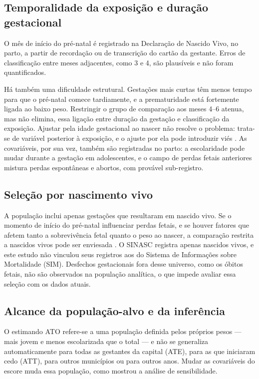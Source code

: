 \documentclass[11pt,a4paper]{article}
\begin{document}
\subsection{Temporalidade da exposição e duração gestacional}\label{sec:temporalidade}

O mês de início do pré-natal é registrado na Declaração de Nascido Vivo, no parto, a
partir de recordação ou de transcrição do cartão da gestante. Erros de classificação entre
meses adjacentes, como 3 e 4, são plausíveis e não foram quantificados.

Há também uma dificuldade estrutural. Gestações mais curtas têm menos tempo para que o
pré-natal comece tardiamente, e a prematuridade está fortemente ligada ao baixo peso.
Restringir o grupo de comparação aos meses 4--6 atenua, mas não elimina, essa ligação entre
duração da gestação e classificação da exposição. Ajustar pela idade gestacional ao nascer
não resolve o problema: trata-se de variável posterior à exposição, e o ajuste por ela
pode introduzir viés \cite{wilcox2011,schisterman2009}. As covariáveis, por sua vez, também
são registradas no parto: a escolaridade pode mudar durante a gestação em adolescentes, e
o campo de perdas fetais anteriores mistura perdas espontâneas e abortos, com provável
sub-registro.

\subsection{Seleção por nascimento vivo}

A população inclui apenas gestações que resultaram em nascido vivo. Se o momento de início
do pré-natal influenciar perdas fetais, e se houver fatores que afetem tanto a
sobrevivência fetal quanto o peso ao nascer, a comparação restrita a nascidos vivos pode
ser enviesada \cite{snowden2018}. O SINASC registra apenas nascidos vivos, e este estudo
não vinculou seus registros aos do Sistema de Informações sobre Mortalidade (SIM).
Desfechos gestacionais fora desse universo, como os óbitos fetais, não são observados na
população analítica, o que impede avaliar essa seleção com os dados atuais.

\subsection{Alcance da população-alvo e da inferência}

O estimando ATO refere-se a uma população definida pelos próprios pesos --- mais jovem e
menos escolarizada que o total --- e não se generaliza automaticamente para todas as
gestantes da capital (ATE), para as que iniciaram cedo (ATT), para outros municípios ou
para outros anos. Mudar as covariáveis do escore muda essa população, como mostrou a
análise de sensibilidade.
\end{document}
